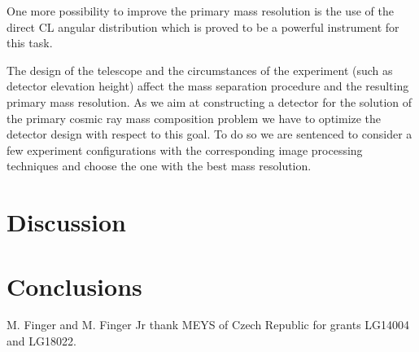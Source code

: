 \documentclass[a4paper,11pt]{article}
\begin{document}
One more possibility to improve the primary mass resolution is the use of the direct CL angular distribution which is proved to be a powerful instrument for this task\cite{Gal18a}.

The design of the telescope and the circumstances of the experiment (such as detector elevation height) affect the mass separation procedure and the resulting primary mass resolution. As we aim at constructing a detector for the solution of the primary cosmic ray mass composition problem we have to optimize the detector design with respect to this goal. To do so we are sentenced to consider a few experiment configurations with the corresponding image processing techniques and choose the one with the best mass resolution.


\section{Discussion}

\section{Conclusions}

\acknowledgments
{}
M. Finger and M. Finger Jr thank MEYS of Czech Republic for grants LG14004 and LG18022.



\end{document}
